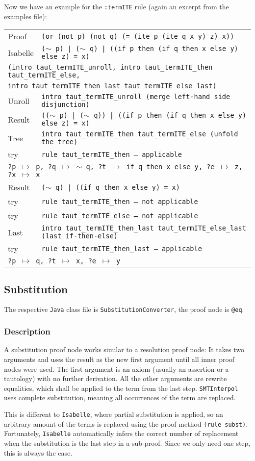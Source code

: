 \documentclass[10pt,a4paper]{article}
\newcommand{\si}{\texttt{SMTInterpol}\xspace}
\newcommand{\isa}{\texttt{Isabelle}\xspace}
\newcommand{\jav}{\texttt{Java}\xspace}
\newcommand{\ttt}{\texttt}
\newcommand{\negat}{\ensuremath{\sim}}
\newcommand{\nega}{\negat\xspace}
\newcommand{\pat}[2]{\ttt{?#1} $\mapsto$ \ttt{#2}}
\def\ind{\quad}
\newcommand{\exl}[2]{\exlm{#1}{\ttt{#2}}}
\newcommand{\exlm}[2]{#1 & #2 \\[1mm]}
\newcommand{\exmc}[2]{\multicolumn{2}{l}{\ttt{#1} #2} \\[1mm]}
\newcommand{\exmcf}[1]{\multicolumn{2}{l}{\ttt{#1}}}
\begin{document}
\bigskip \noindent Now we have an example for the \ttt{:termITE} rule (again an excerpt from the examples file):

\bigskip \noindent \begin{tabular}{ll}
	\exl{Proof}{(or (not p) (not q) (= (ite p (ite q x y) z) x))}
	\exl{Isabelle}{(\nega p) | (\nega q) | ((if p then (if q then x else y) else z) = x)}
	\exmc{(intro taut\_termITE\_unroll, intro taut\_termITE\_then taut\_termITE\_else,}{}
		\exmc{\ind intro taut\_termITE\_then\_last taut\_termITE\_else\_last)}{}
	\exl{Unroll}{intro taut\_termITE\_unroll \rm{(merge left-hand side disjunction)}}
	\exl{Result}{((\nega p) | (\nega q)) | ((if p then (if q then x else y) else z) = x)}
	\exl{Tree}{intro taut\_termITE\_then taut\_termITE\_else \rm{(unfold the tree)}}
	\exl{try}{rule taut\_termITE\_then \rm{-- applicable}}
	\exmc{\ind \pat{p}{p}, \pat{q}{\nega q}, \pat{t}{if q then x else y}, \pat{e}{z}, \pat{x}{x}}{}
	\exl{Result}{(\nega q) | ((if q then x else y) = x)}
	\exl{try}{rule taut\_termITE\_then \rm{-- not applicable}}
	\exl{try}{rule taut\_termITE\_else \rm{-- not applicable}}
	\exl{Last}{intro taut\_termITE\_then\_last taut\_termITE\_else\_last \rm{(last if-then-else)}}
	\exl{try}{rule taut\_termITE\_then\_last \rm{-- applicable}}
	\exmcf{\ind \pat{p}{q}, \pat{t}{x}, \pat{e}{y}}{}
\end{tabular}
%
\subsection{Substitution}\label{sec:subst}
The respective \jav class file is \ttt{SubstitutionConverter}, the proof node is \ttt{@eq}.
%
\subsubsection*{Description}
A substitution proof node works similar to a resolution proof node: It takes two arguments and uses the result as the new first argument until all inner proof nodes were used. The first argument is an axiom (usually an assertion or a tautology) with no further derivation. All the other arguments are rewrite equalities, which shall be applied to the term from the last step. \si uses complete substitution, meaning all occurrences of the term are replaced.

This is different to \isa, where partial substitution is applied, so an arbitrary amount of the terms is replaced using the proof method \ttt{(rule subst)}. Fortunately, \isa automatically infers the correct number of replacement when the substitution is the last step in a sub-proof. Since we only need one step, this is always the case.
\end{document}
